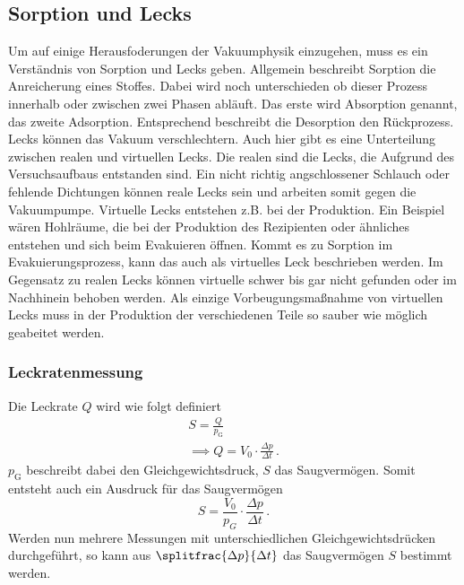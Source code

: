     \subsection{Sorption und Lecks}
        Um auf einige Herausfoderungen der Vakuumphysik einzugehen, muss es ein Verständnis von Sorption und Lecks geben.
        Allgemein beschreibt Sorption die Anreicherung eines Stoffes.
        Dabei wird noch unterschieden ob dieser Prozess innerhalb oder zwischen zwei Phasen abläuft.
        Das erste wird Absorption genannt, das zweite Adsorption.
        Entsprechend beschreibt die Desorption den Rückprozess.
        \noindent
        Lecks können das Vakuum verschlechtern.
        Auch hier gibt es eine Unterteilung zwischen realen und virtuellen Lecks.
        Die realen sind die Lecks, die Aufgrund des Versuchsaufbaus entstanden sind.
        Ein nicht richtig angschlossener Schlauch oder fehlende Dichtungen können reale Lecks sein und arbeiten somit gegen die Vakuumpumpe.
        Virtuelle Lecks entstehen z.B. bei der Produktion.
        Ein Beispiel wären Hohlräume, die bei der Produktion des Rezipienten oder ähnliches entstehen und sich beim Evakuieren öffnen.
        Kommt es zu Sorption im Evakuierungsprozess, kann das auch als virtuelles Leck beschrieben werden.
        Im Gegensatz zu realen Lecks können virtuelle schwer bis gar nicht gefunden oder im Nachhinein behoben werden.
        Als einzige Vorbeugungsmaßnahme von virtuellen Lecks muss in der Produktion der verschiedenen Teile so sauber wie möglich geabeitet werden.
        
        \subsubsection{Leckratenmessung}
            Die Leckrate $Q$ wird wie folgt definiert
            \begin{align*}
                S= \frac{Q}{p_\text{G}} \\
                \implies Q = V_0 \cdot \frac{\Delta p}{\Delta t} \, .
            \end{align*}
            $p_\text{G}$ beschreibt dabei den Gleichgewichtsdruck, $S$ das Saugvermögen.
            Somit entsteht auch ein Ausdruck für das Saugvermögen
            \begin{equation*}
                S = \frac{V_0}{p_G} \cdot \frac{\Delta p}{\Delta t} \, .
            \end{equation*}
            Werden nun mehrere Messungen mit unterschiedlichen Gleichgewichtsdrücken durchgeführt, so kann aus $\splitfrac{\Delta p}{\Delta t}$ das Saugvermögen $S$ bestimmt werden.

